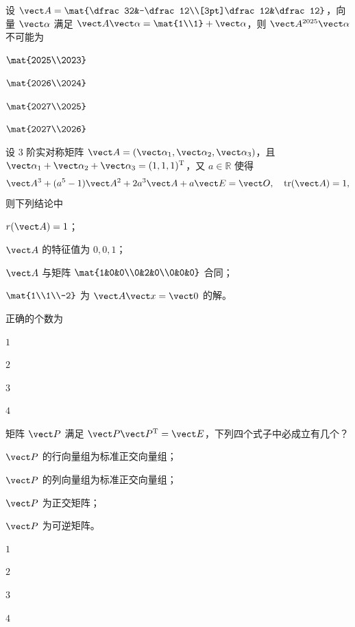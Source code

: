 \begin{question}[index=5]
设 $\vect A=\mat{\dfrac32&-\dfrac12\\[3pt]\dfrac12&\dfrac12}$，向量 $\vect\alpha$ 满足 $\vect A\vect\alpha=\mat{1\\1}+\vect\alpha$，则 $\vect A^{2025}\vect\alpha$ 不可能为
\begin{choices}[columns=4]
\item $\mat{2025\\2023}$
\item $\mat{2026\\2024}$
\item $\mat{2027\\2025}$
\item $\mat{2027\\2026}$
\end{choices}
\end{question}
\QuestionBreak

\begin{question}[index=6]
设 $3$ 阶实对称矩阵 $\vect A=(\vect\alpha_1,\vect\alpha_2,\vect\alpha_3)$，且 $\vect\alpha_1+\vect\alpha_2+\vect\alpha_3=(1,1,1)^{\mathrm T}$，又 $a\in\mathbb R$ 使得
\[
\vect A^3+(a^5-1)\vect A^2+2a^3\vect A+a\vect E=\vect O,\quad \operatorname{tr}(\vect A)=1,
\]
则下列结论中
\par{} $r(\vect A)=1$；
\par{} $\vect A$ 的特征值为 $0,0,1$；
\par{} $\vect A$ 与矩阵 $\mat{1&0&0\\0&2&0\\0&0&0}$ 合同；
\par{} $\mat{1\\1\\-2}$ 为 $\vect A\vect x=\vect0$ 的解。
\par 正确的个数为
\begin{choices}[columns=4]
\item $1$
\item $2$
\item $3$
\item $4$
\end{choices}
\end{question}
\QuestionBreak

\begin{question}[index=7]
矩阵 $\vect P$ 满足 $\vect P\vect P^{\mathrm T}=\vect E$，下列四个式子中必成立有几个？
\par{} $\vect P$ 的行向量组为标准正交向量组；
\par{} $\vect P$ 的列向量组为标准正交向量组；
\par{} $\vect P$ 为正交矩阵；
\par{} $\vect P$ 为可逆矩阵。
\begin{choices}[columns=4]
\item $1$
\item $2$
\item $3$
\item $4$
\end{choices}
\end{question}
\QuestionBreak

